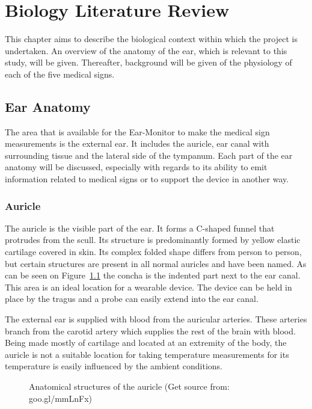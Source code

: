 \chapter{Biology Literature Review}
\label{chp:Biology Literature Review}
This chapter aims to describe the biological context within which the project is undertaken. An overview of the anatomy of the ear, which is relevant to this study, will be given. Thereafter, background will be given of the physiology of each of the five medical signs.

\section{Ear Anatomy} %
The area that is available for the Ear-Monitor to make the medical sign measurements is the external ear. It includes the auricle, ear canal with surrounding tissue and the lateral side of the tympanum.  Each part of the ear anatomy will be discussed, especially with regards to its ability to emit information related to medical signs or to support the device in another way.

\subsection{Auricle}
The auricle is the visible part of the ear. It forms a C-shaped funnel that protrudes from the scull. Its structure is predominantly formed by yellow elastic cartilage covered in skin. Its complex folded shape differs from person to person, but certain structures are present in all normal auricles and have been named. As can be seen on Figure~\ref{fig:Auricle} the concha is the indented part next to the ear canal. This area is an ideal location for a wearable device. The device can be held in place by the tragus and a probe can easily extend into the ear canal.

\medskip

The external ear is supplied with blood from the auricular arteries. These arteries branch from the carotid artery which supplies the rest of the brain with blood. Being made mostly of cartilage and located at an extremity of the body, the auricle is not a suitable location for taking temperature measurements for its temperature is easily influenced by the ambient conditions.

\medskip

\begin{figure}[H]
\centering
\graphicspath{{figs/}}
\def\svgwidth{200pt}

\caption{Anatomical structures of the auricle (Get source from: goo.gl/mmLnFx)}
\label{fig:Auricle}
\end{figure}

